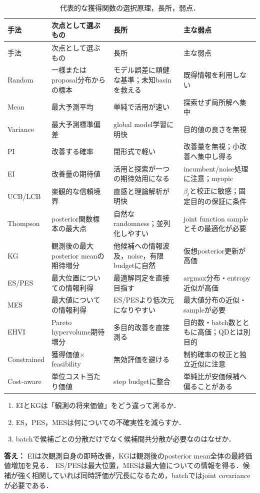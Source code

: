 \documentclass[a4paper,11pt]{ltjsarticle}
\begin{document}
\begingroup
\small
\setlength{\tabcolsep}{3.5pt}
\begin{longtable}{C{22mm}p{34mm}p{48mm}p{48mm}}
\caption{代表的な獲得関数の選択原理，長所，弱点．}
\label{tab:acquisition-comparison}\\
\toprule
手法&次点として選ぶもの&長所&主な弱点\\
\midrule
\endfirsthead
\toprule
手法&次点として選ぶもの&長所&主な弱点\\
\midrule
\endhead
Random&一様またはproposal分布からの標本&モデル誤差に頑健な基準；未知basinを救える&既得情報を利用しない\\
Mean&最大予測平均&単純で活用が速い&探索せず局所解へ集中\\
Variance&最大予測標準偏差&global model学習に明快&目的値の良さを無視\\
PI&改善する確率&閉形式で軽い&改善量を無視；小改善へ集中し得る\\
EI&改善量の期待値&活用と探索が一つの期待効用になる&incumbent/noise処理に注意；myopic\\
UCB/LCB&楽観的な信頼境界&直感と理論解析が明快&\(\beta_t\)と校正に敏感；固定目的の保証に条件\\
Thompson&posterior関数標本の最大点&自然なrandomness；並列化しやすい&joint function sampleとその最適化が必要\\
KG&観測後の最大posterior meanの期待増分&他候補への情報波及，noise，有限budgetに自然&仮想posterior更新が高価\\
ES/PES&最大位置についての情報利得&最適解同定を直接目指す&argmax分布・entropy近似が高価\\
MES&最大値についての情報利得&ES/PESより低次元になりやすい&最大値分布の近似・sampleが必要\\
EHVI&Pareto hypervolume期待増分&多目的改善を直接測る&目的数・batch数とともに高価；QDとは別目的\\
Constrained&獲得価値\(\times\)feasibility&無効評価を避ける&制約確率の校正と独立近似に注意\\
Cost-aware&単位コスト当たり価値&step budgetに整合&単純比が安価候補へ偏ることがある\\
\bottomrule
\end{longtable}
\endgroup

\begin{checkpointbox}
\begin{enumerate}
  \item EIとKGは「観測の将来価値」をどう違って測るか．
  \item ES，PES，MESは何についての不確実性を減らすか．
  \item batchで候補ごとの分散だけでなく候補間共分散が必要なのはなぜか．
\end{enumerate}
\textbf{答え：} EIは次観測自身の即時改善，KGは観測後のposterior mean全体の最終価値増加を見る．
ES/PESは最大位置，MESは最大値についての情報を得る．候補が強く相関していれば同時評価が冗長になるため，batchではjoint covarianceが必要である．
\end{checkpointbox}
\end{document}
